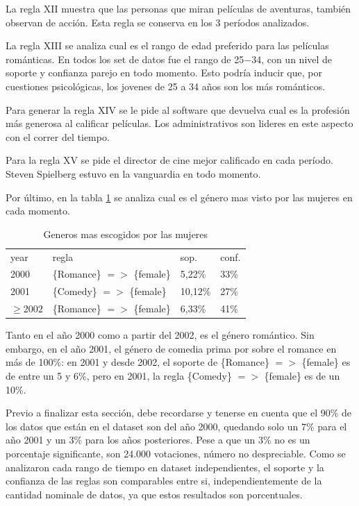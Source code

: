 \documentclass[journal]{IEEEtran}
\begin{document}
La regla XII muestra que las personas que miran películas de aventuras, también
observan de acción. Esta regla se conserva en los 3 períodos analizados.

La regla XIII se analiza cual es el rango de edad preferido para las películas
románticas. En todos los set de datos fue el rango de 25$-$34, con un nivel
de soporte y confianza parejo en todo momento. Esto podría inducir que, 
por cuestiones psicológicas, los jovenes de 25 a 34 años son los más 
románticos.

Para generar la regla XIV se le pide al software que devuelva cual es la profesión
más generosa al calificar películas. Los administrativos son lideres en este
aspecto con el correr del tiempo.

Para la regla XV se pide el director de cine mejor calificado en cada período.
Steven Spielberg estuvo en la vanguardia en todo momento.

Por último, en la tabla \ref{genre_female} se analiza cual 
es el género mas visto por las mujeres en cada momento.

\begin{table}[ht!]
\caption{Generos mas escogidos por las mujeres}
\label{genre_female}
\centering
\begin{tabular}{l l l l }
year & regla & sop. & conf. \\
2000 & \{Romance\} $=$$>$ \{female\} & 5,22\% & 33\%  \\
2001 & \{Comedy\} $=$$>$ \{female\} & 10,12\% & 27\%  \\
$\geq 2002$ & \{Romance\} $=$$>$ \{female\} & 6,33\% & 41\%  \\
\end{tabular}
\end{table}

Tanto en el año 2000 como a partir del 2002, es el género romántico. Sin embargo, 
en el año 2001, el género de comedia prima por sobre el romance en más de 100\%:
en 2001 y desde 2002, el soporte de \{Romance\} $=$$>$ \{female\} es de entre
un 5 y 6\%, pero en 2001, la regla \{Comedy\} $=$$>$ \{female\} es de un 10\%.

Previo a finalizar esta sección, debe recordarse y tenerse en cuenta que 
 el 90\% de los datos que están en el dataset son del año 2000, quedando solo un 7\%
para el año 2001 y un 3\% para los años posteriores. Pese a que un  3\% 
no es un porcentaje significante, son 24.000 votaciones, número no despreciable.
Como se analizaron cada rango de tiempo en dataset independientes, el soporte
y la confianza de las reglas son comparables entre si, independientemente de la 
cantidad nominale de datos, ya que estos resultados son porcentuales.
\end{document}
